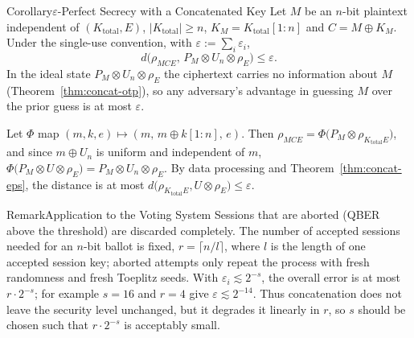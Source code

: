 \begin{statementB}{Corollary}{$\varepsilon$-Perfect Secrecy with a Concatenated Key}\label{cor:concat-eps-otp}
Let $M$ be an $n$-bit plaintext independent of $(K_{\mathrm{total}},E)$, $|K_{\mathrm{total}}|\ge n$, $K_M=K_{\mathrm{total}}[1:n]$ and $C=M\oplus K_M$. Under the single-use convention, with $\varepsilon\mathrel{:=}\sum_i\varepsilon_i$,
\[
d\bigl(\rho_{MCE},\,P_M\otimes U_n\otimes\rho_E\bigr)\le\varepsilon .
\]
In the ideal state $P_M\otimes U_n\otimes\rho_E$ the ciphertext carries no information about $M$ (Theorem~\ref{thm:concat-otp}), so any adversary's advantage in guessing $M$ over the prior guess is at most $\varepsilon$.
\end{statementB}
\begin{proofB}
Let $\Phi$ map $(m,k,e)\mapsto(m,\,m\oplus k[1:n],\,e)$. Then $\rho_{MCE}=\Phi\bigl(P_M\otimes\rho_{K_{\mathrm{total}}E}\bigr)$, and since $m\oplus U_n$ is uniform and independent of $m$, $\Phi\bigl(P_M\otimes U\otimes\rho_E\bigr)=P_M\otimes U_n\otimes\rho_E$. By data processing and Theorem~\ref{thm:concat-eps}, the distance is at most $d\bigl(\rho_{K_{\mathrm{total}}E},U\otimes\rho_E\bigr)\le\varepsilon$.
\end{proofB}

\begin{statementB}{Remark}{Application to the Voting System}
Sessions that are aborted (QBER above the threshold) are discarded completely. The number of accepted sessions needed for an $n$-bit ballot is fixed, $r=\lceil n/l\rceil$, where $l$ is the length of one accepted session key; aborted attempts only repeat the process with fresh randomness and fresh Toeplitz seeds. With $\varepsilon_i\lesssim2^{-s}$, the overall error is at most $r\cdot2^{-s}$; for example $s=16$ and $r=4$ give $\varepsilon\lesssim2^{-14}$. Thus concatenation does not leave the security level unchanged, but it degrades it linearly in $r$, so $s$ should be chosen such that $r\cdot2^{-s}$ is acceptably small.
\end{statementB}


